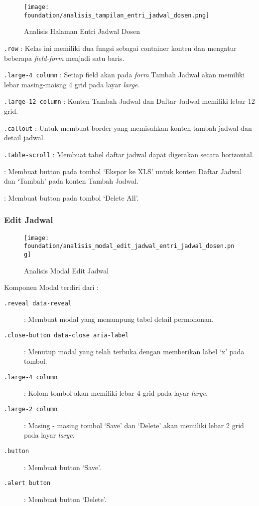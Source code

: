 \begin{figure} [H]
\centering  
\texttt{[image: foundation/analisis\_tampilan\_entri\_jadwal\_dosen.png]}
\caption{Analisis Halaman Entri Jadwal Dosen}
\end{figure}
\begin{description}
	\item \texttt{.row} : Kelas ini memiliki dua fungsi sebagai container konten dan mengatur beberapa \textit{field-form} menjadi satu baris. 
	\item \texttt{.large-4 column} : Setiap field akan pada \textit{form} Tambah Jadwal akan memiliki lebar masing-maisng 4 grid pada layar \textit{large}.
	\item \texttt{.large-12 column} : Konten Tambah Jadwal dan Daftar Jadwal memiliki lebar 12 grid.
	\item \texttt{.callout} : Untuk membuat border yang memisahkan konten tambah jadwal dan detail jadwal.
	\item \texttt{.table-scroll} : Membuat tabel daftar jadwal dapat digerakan secara horizontal.
	\item [\texttt{button}] : Membuat button pada tombol `Ekspor ke XLS' untuk konten Daftar Jadwal dan `Tambah' pada konten Tambah Jadwal.
	\item [\texttt{.alert button}] : Membuat button pada tombol `Delete All'.
	
\end{description}
\subsubsection{Edit Jadwal}
\begin{figure} [H]
\centering  
\texttt{[image: foundation/analisis\_modal\_edit\_jadwal\_entri\_jadwal\_dosen.png]}
\caption{Analisis Modal Edit Jadwal}
\end{figure}
Komponen Modal terdiri dari :
\begin{description}
	\item [\texttt{.reveal data-reveal}] : Membuat modal yang menampung tabel detail permohonan.
	\item [\texttt{.close-button data-close aria-label}] : Menutup modal yang telah terbuka dengan memberikan label `x' pada tombol.
	\item [\texttt{.large-4 column}] : Kolom tombol akan memiliki lebar 4 grid pada layar \textit{large}.
	\item [\texttt{.large-2 column}] : Masing - masing tombol `Save' dan `Delete' akan memiliki lebar 2 grid pada layar \textit{large}.
	\item [\texttt{.button}] : Membuat button `Save'.
	\item [\texttt{.alert button}] : Membuat button `Delete'.
\end{description}
